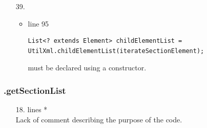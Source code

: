 \documentclass[english]{article}
\begin{document}
\begin{itemize}
		\item[39.]{ 
			\begin{itemize}
				\item{line 95
						\begin{lstlisting}
List<? extends Element> childElementList = UtilXml.childElementList(iterateSectionElement);
						\end{lstlisting} must be declared using a constructor.}
			\end{itemize}
}
\end{itemize}
	
\subsubsection*{.getSectionList}	
\begin{itemize}
\item[18.]{lines  *\\
		Lack of comment describing the purpose of the code.}
\end{itemize}
\end{document}
